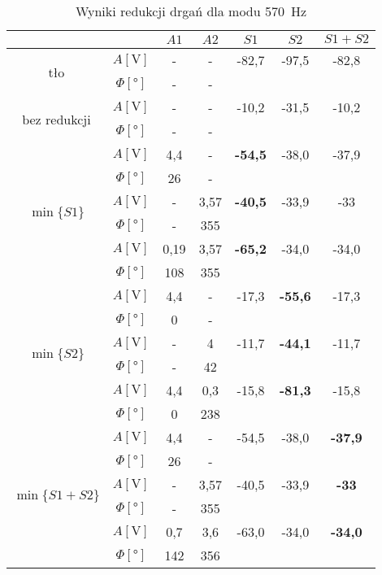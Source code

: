 \documentclass[polish,a4paper,11pt]{mwart}
\begin{document}
\begin{table}[!tbh]
  \centering
  \caption{Wyniki redukcji drgań dla modu \SI{570}{\hertz}}
  \label{tab:red3}
  \begin{tabular}{|c|c|c|c|c|c|c|}
    \cline{3-7}
    \multicolumn{2}{c|}{}&$A1$&$A2$&$S1$&$S2$&$S1+S2$\\\hline
    \multirow{2}{*}{tło}               &   $A [\si{\V}]$ & - & - & -82,7 & -97,5 & -82,8 \\\cline{2-7}
				       &$\Phi [\si{\degree}]$ & - & - & \multicolumn{3}{c}{}\\\hline
    \multirow{2}{*}{bez redukcji} &   $A [\si{\V}]$ & - & - & -10,2 & -31,5 & -10,2 \\\cline{2-7}
				       &$\Phi [\si{\degree}]$ & - & - & \multicolumn{3}{c}{}\\\hline
    \multirow{6}{*}{$\min\{S1\}$}      &   $A [\si{\V}]$ & 4,4 & - & \textbf{-54,5} & -38,0 & -37,9 \\\cline{2-7}
				       &$\Phi [\si{\degree}]$ & 26 & - & \multicolumn{3}{c}{}\\\cline{2-7}
				       &   $A [\si{\V}]$ & - & 3,57 & \textbf{-40,5} & -33,9 & -33 \\\cline{2-7}
				       &$\Phi [\si{\degree}]$ & - & 355 & \multicolumn{3}{c}{}\\\cline{2-7}
				       &   $A [\si{\V}]$ & 0,19 & 3,57 & \textbf{-65,2} & -34,0 & -34,0\\\cline{2-7}
				       &$\Phi [\si{\degree}]$ & 108 & 355 & \multicolumn{3}{c}{}\\\hline
    \multirow{6}{*}{$\min\{S2\}$}      &   $A [\si{\V}]$ & 4,4 & - & -17,3 & \textbf{-55,6} & -17,3 \\\cline{2-7}
				       &$\Phi [\si{\degree}]$ & 0 & - & \multicolumn{3}{c}{}\\\cline{2-7}
				       &   $A [\si{\V}]$ & - & 4 & -11,7 & \textbf{-44,1} & -11,7 \\\cline{2-7}
				       &$\Phi [\si{\degree}]$ & - & 42 & \multicolumn{3}{c}{}\\\cline{2-7}
				       &   $A [\si{\V}]$ & 4,4 & 0,3 & -15,8 & \textbf{-81,3} & -15,8 \\\cline{2-7}
				       &$\Phi [\si{\degree}]$ & 0 & 238 & \multicolumn{3}{c}{}\\\hline
    \multirow{6}{*}{$\min\{S1+S2\}$}   &   $A [\si{\V}]$ & 4,4 & - & -54,5 & -38,0 & \textbf{-37,9}\\\cline{2-7}
				       &$\Phi [\si{\degree}]$ & 26 & - & \multicolumn{3}{c}{}\\\cline{2-7}
				       &   $A [\si{\V}]$ & - & 3,57 & -40,5 & -33,9 & \textbf{-33} \\\cline{2-7}
				       &$\Phi [\si{\degree}]$ & - & 355 & \multicolumn{3}{c}{}\\\cline{2-7}
				       &   $A [\si{\V}]$ & 0,7 & 3,6 & -63,0 & -34,0& \textbf{-34,0} \\\cline{2-7}
				       &$\Phi [\si{\degree}]$ & 142 & 356 & \multicolumn{3}{c}{}\\\cline{1-4}
  \end{tabular}
\end{table}
\end{document}
